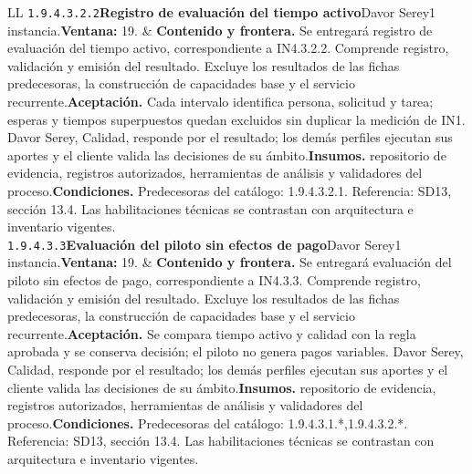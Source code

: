 \begin{longtable}{L{\tabcolsep\relax}L{\tabcolsep\relax}}
\texttt{1.\allowbreak{}9.\allowbreak{}4.\allowbreak{}3.\allowbreak{}2.\allowbreak{}2}\newline{}\textbf{Registro de evaluación del tiempo activo}\newline{}Davor Serey\newline{}1 instancia.\newline{}\textbf{Ventana:} 19. & \textbf{Contenido y frontera.} Se entregará registro de evaluación del tiempo activo, correspondiente a IN4.3.2.2. Comprende registro, validación y emisión del resultado. Excluye los resultados de las fichas predecesoras, la construcción de capacidades base y el servicio recurrente.\newline{}\textbf{Aceptación.} Cada intervalo identifica persona, solicitud y tarea; esperas y tiempos superpuestos quedan excluidos sin duplicar la medición de IN1. Davor Serey, Calidad, responde por el resultado; los demás perfiles ejecutan sus aportes y el cliente valida las decisiones de su ámbito.\newline{}\textbf{Insumos.} repositorio de evidencia, registros autorizados, herramientas de análisis y validadores del proceso.\newline{}\textbf{Condiciones.} Predecesoras del catálogo: 1.9.4.3.2.1. Referencia: SD13, sección 13.4. Las habilitaciones técnicas se contrastan con arquitectura e inventario vigentes.\\\hline
\texttt{1.\allowbreak{}9.\allowbreak{}4.\allowbreak{}3.\allowbreak{}3}\newline{}\textbf{Evaluación del piloto sin efectos de pago}\newline{}Davor Serey\newline{}1 instancia.\newline{}\textbf{Ventana:} 19. & \textbf{Contenido y frontera.} Se entregará evaluación del piloto sin efectos de pago, correspondiente a IN4.3.3. Comprende registro, validación y emisión del resultado. Excluye los resultados de las fichas predecesoras, la construcción de capacidades base y el servicio recurrente.\newline{}\textbf{Aceptación.} Se compara tiempo activo y calidad con la regla aprobada y se conserva decisión; el piloto no genera pagos variables. Davor Serey, Calidad, responde por el resultado; los demás perfiles ejecutan sus aportes y el cliente valida las decisiones de su ámbito.\newline{}\textbf{Insumos.} repositorio de evidencia, registros autorizados, herramientas de análisis y validadores del proceso.\newline{}\textbf{Condiciones.} Predecesoras del catálogo: 1.9.4.3.1.*,1.9.4.3.2.*. Referencia: SD13, sección 13.4. Las habilitaciones técnicas se contrastan con arquitectura e inventario vigentes.\\\hline

\end{longtable}
